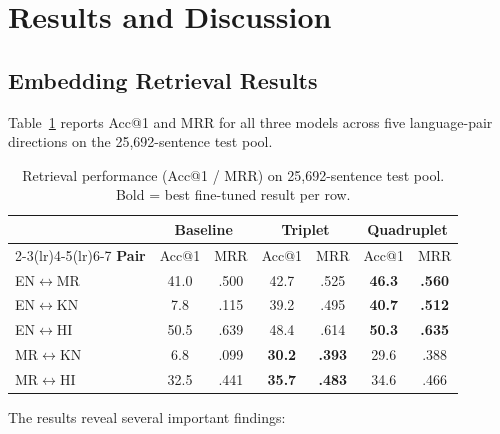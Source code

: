 \documentclass[conference,letterpaper]{IEEEtran}
\begin{document}
\vspace{0.5cm}

\section{Results and Discussion}

\subsection{Embedding Retrieval Results}
Table~\ref{tab:acc1} reports Acc@1 and MRR for all three models across
five language-pair directions on the 25,692-sentence test pool.

\begin{table}[h]
\centering
\caption{Retrieval performance (Acc@1 / MRR) on 25,692-sentence test pool.
Bold = best fine-tuned result per row.}
\label{tab:acc1}
\renewcommand{\arraystretch}{1.2}
\begin{tabular}{lcccccc}
\toprule
& \multicolumn{2}{c}{\textbf{Baseline}} & \multicolumn{2}{c}{\textbf{Triplet}} & \multicolumn{2}{c}{\textbf{Quadruplet}} \\
\cmidrule(lr){2-3}\cmidrule(lr){4-5}\cmidrule(lr){6-7}
\textbf{Pair} & Acc@1 & MRR & Acc@1 & MRR & Acc@1 & MRR \\
\midrule
EN$\leftrightarrow$MR & 41.0 & .500 & 42.7 & .525 & \textbf{46.3} & \textbf{.560} \\
EN$\leftrightarrow$KN &  7.8 & .115 & 39.2 & .495 & \textbf{40.7} & \textbf{.512} \\
EN$\leftrightarrow$HI & 50.5 & .639 & 48.4 & .614 & \textbf{50.3} & \textbf{.635} \\
MR$\leftrightarrow$KN &  6.8 & .099 & \textbf{30.2} & \textbf{.393} & 29.6 & .388 \\
MR$\leftrightarrow$HI & 32.5 & .441 & \textbf{35.7} & \textbf{.483} & 34.6 & .466 \\
\bottomrule
\end{tabular}
\end{table}

The results reveal several important findings:
\end{document}
